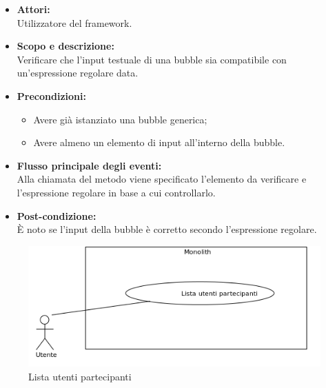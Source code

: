 \begin{itemize}
	\item \textbf{Attori:}
	\\Utilizzatore del framework.
	\item \textbf{Scopo e descrizione:} 
	\\Verificare che l'input testuale di una bubble sia compatibile con un'espressione regolare data.
	\item \textbf{Precondizioni:}
	\begin{itemize}
		\item Avere già istanziato una bubble generica;
		\item Avere almeno un elemento di input all'interno della bubble.
	\end{itemize}
	\item \textbf{Flusso principale degli eventi:}
	\\Alla chiamata del metodo viene specificato l'elemento da verificare e l'espressione regolare in base a cui controllarlo.
	\item \textbf{Post-condizione:}
	\\È noto se l'input della bubble è corretto secondo l'espressione regolare.
\end{itemize}


\begin{figure}[H]
	\centering
	\includegraphics[width=15cm]{../../documenti/AnalisiDeiRequisiti/Diagrammi_img/uc1_14.png}
	\caption{\UCCaption{} Lista utenti partecipanti}
\end{figure}

